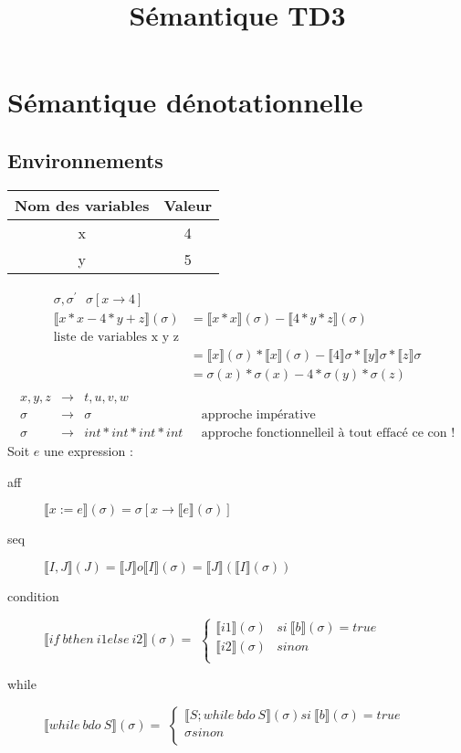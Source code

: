 \documentclass[11pt,a4paper]{article}
\title{Sémantique TD3}
\begin{document}
	\section*{Sémantique dénotationnelle}
	\subsection*{Environnements}
	\begin{tabular}{|c|c|}
		\hline 
		Nom des variables & Valeur \\ 
		\hline 
		x & 4 \\ 
		\hline 
		y & 5 \\ 
		\hline 
	\end{tabular}
	\begin{align*}
		\sigma ,{\sigma }^{\prime }\ \ \ \sigma \left[x{\to }4\right]\\
		 \llbracket x*x - 4*y+z \rrbracket (\sigma) &=  \llbracket x*x \rrbracket (\sigma) -  \llbracket 4*y*z \rrbracket (\sigma)\\
		\text{liste de variables x y z}&\\
		&=  \llbracket x \rrbracket (\sigma) *  \llbracket x \rrbracket (\sigma) -  \llbracket 4 \rrbracket \sigma* \llbracket y \rrbracket \sigma* \llbracket z \rrbracket \sigma\\
		&= \sigma(x) * \sigma(x) - 4 * \sigma(y) * \sigma(z)\\
	\end{align*}
	\begin{align*}
		x,y,z &\to &t,u,v,w\\
		\sigma &\to &\sigma &\ \ \ \text{approche impérative}\\
		\sigma &\to &int * int * int * int &\ \ \ \text{approche fonctionnelle}
		\text{il à tout effacé ce con !}
	\end{align*}
	Soit $e$ une expression :
	\begin{description}
		\item[aff] $ \llbracket x := e \rrbracket (\sigma) = \sigma[x \to  \llbracket e \rrbracket (\sigma)]$
		\item[seq]  $ \llbracket I, J \rrbracket (J) =  \llbracket J \rrbracket  o  \llbracket I \rrbracket (\sigma) =  \llbracket J \rrbracket ( \llbracket I \rrbracket (\sigma))$
		\item[condition] $ \llbracket if\ b then\ i1 else\ i2 \rrbracket (\sigma) =$
		$\begin{cases}
			 \llbracket i1 \rrbracket (\sigma) & si\  \llbracket b \rrbracket (\sigma) = true\\
			 \llbracket i2 \rrbracket (\sigma) & sinon\\
		\end{cases}$
		\item[while] $ \llbracket while\ b do\ S \rrbracket (\sigma) =$
		$\begin{cases}
			 \llbracket S; while\ b do\ S \rrbracket (\sigma) si\  \llbracket b \rrbracket (\sigma) = true\\
			\sigma sinon\\
		\end{cases}$
	\end{description}
	\newpage
\end{document}
